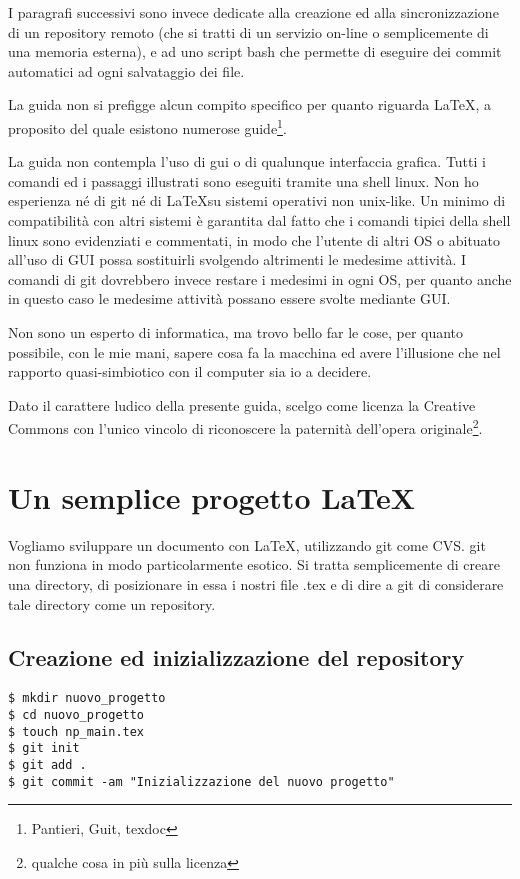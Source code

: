 \documentclass[a4paper,12pt,oneside]{article}
\begin{document}
I paragrafi successivi sono invece dedicate alla creazione ed alla
sincronizzazione di un repository remoto (che si tratti di un servizio on-line
o semplicemente di una memoria esterna), e ad uno script bash che permette di
eseguire dei commit automatici ad ogni salvataggio dei file.

La guida non si prefigge alcun compito specifico per quanto riguarda \LaTeX, a
proposito del quale esistono numerose guide\footnote{Pantieri, Guit, 
texdoc}.

La guida non contempla l'uso di gui o di qualunque interfaccia grafica. Tutti i
comandi ed i passaggi illustrati sono eseguiti tramite una shell linux.
Non ho esperienza né di git né di \LaTeX su sistemi operativi non
unix-like. Un minimo di compatibilità con altri sistemi è garantita dal fatto
che i comandi tipici della shell linux sono evidenziati e commentati, in modo
che l'utente di altri OS o abituato all'uso di GUI possa sostituirli svolgendo
altrimenti le medesime attività. I comandi di git dovrebbero invece restare i
medesimi in ogni OS, per quanto anche in questo caso le medesime attività
possano essere svolte mediante GUI.

Non sono un esperto di informatica, ma trovo bello far le cose, per quanto
possibile, con le mie mani, sapere cosa fa la macchina ed avere l'illusione che
nel rapporto quasi-simbiotico con il computer sia io a decidere.

Dato il carattere ludico della presente guida, scelgo come licenza la Creative
Commons con l'unico vincolo di riconoscere la paternità dell'opera
originale\footnote{qualche cosa in più sulla licenza}.

\section{Un semplice progetto \LaTeX}
Vogliamo sviluppare un documento con \LaTeX, utilizzando git come CVS.
git non funziona in modo particolarmente esotico. Si tratta semplicemente di
creare una directory, di posizionare in essa i nostri file .tex e di dire a git
di considerare tale directory come un repository.

\subsection{Creazione ed inizializzazione del repository}
\begin{lstlisting}
$ mkdir nuovo_progetto
$ cd nuovo_progetto
$ touch np_main.tex
$ git init
$ git add .
$ git commit -am "Inizializzazione del nuovo progetto"
\end{lstlisting}
\end{document}
